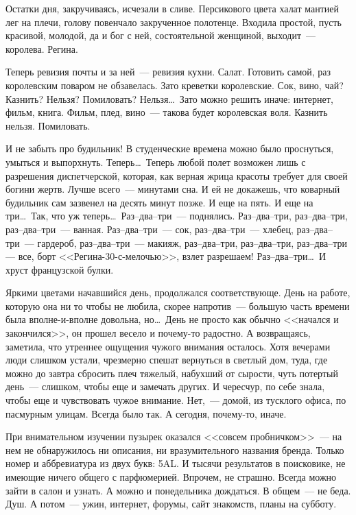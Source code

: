 Остатки дня, закручиваясь, исчезали в сливе. Персикового цвета халат мантией лег
на плечи, голову повенчало закрученное полотенце. Входила простой, пусть
красивой, молодой, да и бог с ней, состоятельной женщиной, выходит~--- королева.
Регина.

Теперь ревизия почты и за ней~--- ревизия кухни. Салат. Готовить самой, раз
королевским поваром не обзавелась. Зато креветки королевские. 
Сок, вино, чай? Казнить? Нельзя? Помиловать? Нельзя\ldots\ Зато можно решить иначе:
интернет, фильм, книга. Фильм, плед, вино~--- такова будет королевская воля.
Казнить нельзя. Помиловать.

И не забыть про будильник! В студенческие времена можно было проснуться, умыться
и выпорхнуть. Теперь\ldots\ Теперь любой полет возможен лишь с разрешения
диспетчерской, которая, как верная жрица красоты требует для своей богини жертв.
Лучше всего~--- минутами сна. И ей не докажешь, что коварный будильник сам
зазвенел на десять минут позже. И еще на пять. И еще на три\ldots\
Так, что уж теперь\ldots\ Раз--два--три~--- поднялись. Раз--два--три, 
раз--два--три,
раз--два--три~--- ванная. Раз--два--три~--- сок, раз--два--три~--- хлебец, 
раз--два--три~---
гардероб, раз--два--три~--- макияж, раз--два--три, раз--два--три, раз--два--три 
--- все,
борт <<Регина-30-с-мелочью>>, взлет разрешаем! Раз--два--три\ldots\ И хруст французской
булки.

Яркими цветами начавшийся день, продолжался соответствующе. День на работе, 
которую она ни то чтобы не любила, скорее напротив~--- большую часть времени 
была 
вполне-и-вполне довольна, но\ldots\ День не просто как обычно <<начался и 
закончился>>, он прошел весело и почему-то радостно. А возвращаясь, заметила, что 
утреннее ощущения чужого внимания осталось. Хотя вечерами люди слишком устали, 
чрезмерно спешат вернуться в светлый дом, туда, где можно до завтра сбросить плеч 
тяжелый, набухший от сырости, чуть потертый день~--- слишком, чтобы еще и 
замечать 
других. И чересчур, по себе знала, чтобы еще и чувствовать чужое внимание. 
Нет,~--- 
домой, из тусклого офиса, по пасмурным улицам. Всегда было так. А сегодня, 
почему-то, иначе.

При внимательном изучении пузырек оказался <<совсем пробничком>>~--- на нем не 
обнаружилось ни описания, ни вразумительного названия бренда. Только номер и 
аббревиатура из двух букв: 5AL. И тысячи результатов в поисковике, не имеющие 
ничего общего с парфюмерией. Впрочем, не страшно. Всегда можно зайти в салон и 
узнать. А можно и понедельника дождаться. В общем~--- не беда. Душ. А потом~--- 
ужин, интернет, форумы, сайт знакомств, планы на субботу.

